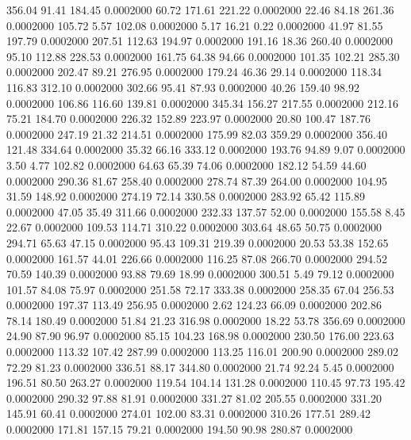  356.04   91.41  184.45   0.0002000
  60.72  171.61  221.22   0.0002000
  22.46   84.18  261.36   0.0002000
 105.72    5.57  102.08   0.0002000
   5.17   16.21    0.22   0.0002000
  41.97   81.55  197.79   0.0002000
 207.51  112.63  194.97   0.0002000
 191.16   18.36  260.40   0.0002000
  95.10  112.88  228.53   0.0002000
 161.75   64.38   94.66   0.0002000
 101.35  102.21  285.30   0.0002000
 202.47   89.21  276.95   0.0002000
 179.24   46.36   29.14   0.0002000
 118.34  116.83  312.10   0.0002000
 302.66   95.41   87.93   0.0002000
  40.26  159.40   98.92   0.0002000
 106.86  116.60  139.81   0.0002000
 345.34  156.27  217.55   0.0002000
 212.16   75.21  184.70   0.0002000
 226.32  152.89  223.97   0.0002000
  20.80  100.47  187.76   0.0002000
 247.19   21.32  214.51   0.0002000
 175.99   82.03  359.29   0.0002000
 356.40  121.48  334.64   0.0002000
  35.32   66.16  333.12   0.0002000
 193.76   94.89    9.07   0.0002000
   3.50    4.77  102.82   0.0002000
  64.63   65.39   74.06   0.0002000
 182.12   54.59   44.60   0.0002000
 290.36   81.67  258.40   0.0002000
 278.74   87.39  264.00   0.0002000
 104.95   31.59  148.92   0.0002000
 274.19   72.14  330.58   0.0002000
 283.92   65.42  115.89   0.0002000
  47.05   35.49  311.66   0.0002000
 232.33  137.57   52.00   0.0002000
 155.58    8.45   22.67   0.0002000
 109.53  114.71  310.22   0.0002000
 303.64   48.65   50.75   0.0002000
 294.71   65.63   47.15   0.0002000
  95.43  109.31  219.39   0.0002000
  20.53   53.38  152.65   0.0002000
 161.57   44.01  226.66   0.0002000
 116.25   87.08  266.70   0.0002000
 294.52   70.59  140.39   0.0002000
  93.88   79.69   18.99   0.0002000
 300.51    5.49   79.12   0.0002000
 101.57   84.08   75.97   0.0002000
 251.58   72.17  333.38   0.0002000
 258.35   67.04  256.53   0.0002000
 197.37  113.49  256.95   0.0002000
   2.62  124.23   66.09   0.0002000
 202.86   78.14  180.49   0.0002000
  51.84   21.23  316.98   0.0002000
  18.22   53.78  356.69   0.0002000
  24.90   87.90   96.97   0.0002000
  85.15  104.23  168.98   0.0002000
 230.50  176.00  223.63   0.0002000
 113.32  107.42  287.99   0.0002000
 113.25  116.01  200.90   0.0002000
 289.02   72.29   81.23   0.0002000
 336.51   88.17  344.80   0.0002000
  21.74   92.24    5.45   0.0002000
 196.51   80.50  263.27   0.0002000
 119.54  104.14  131.28   0.0002000
 110.45   97.73  195.42   0.0002000
 290.32   97.88   81.91   0.0002000
 331.27   81.02  205.55   0.0002000
 331.20  145.91   60.41   0.0002000
 274.01  102.00   83.31   0.0002000
 310.26  177.51  289.42   0.0002000
 171.81  157.15   79.21   0.0002000
 194.50   90.98  280.87   0.0002000
